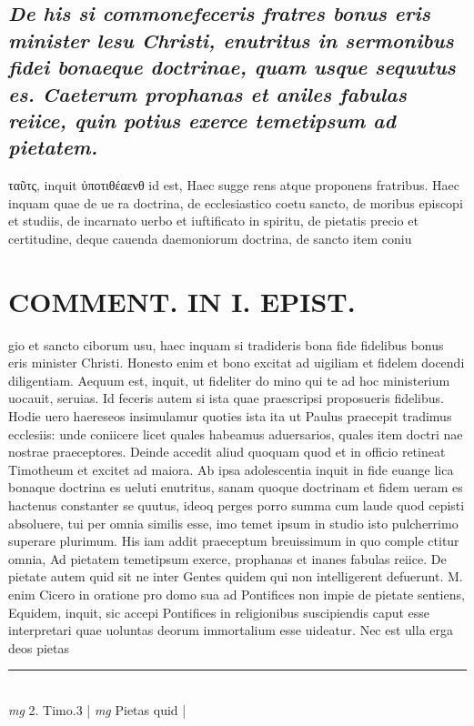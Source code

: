 \documentclass{article}
\begin{document}
\begin{pages}
\subsection*{\textit{De his si commonefeceris fratres bonus eris minister lesu Christi, enutritus in sermonibus fidei bonaeque doctrinae, quam usque sequutus es. Caeterum prophanas et aniles fabulas reiice, quin potius exerce temetipsum ad pietatem. }}\pstart ταῦτς, inquit ὐποτιθέαενθ id est, Haec sugge rens atque proponens fratribus. Haec inquam quae de ue ra doctrina, de ecclesiastico coetu sancto, de moribus episcopi et studiis, de incarnato uerbo et iuftificato in spiritu, de pietatis precio et certitudine, deque cauenda daemoniorum doctrina, de sancto item coniu\pend
\section*{COMMENT. IN I. EPIST. }\pstart gio et sancto ciborum usu, haec inquam si tradideris bona fide fidelibus bonus eris minister Christi. Honesto enim et bono excitat ad uigiliam et fidelem docendi diligentiam. Aequum est, inquit, ut fideliter do mino qui te ad hoc ministerium uocauit, seruias. Id feceris autem si ista quae praescripsi proposueris fidelibus. Hodie uero haereseos insimulamur quoties ista ita ut Paulus praecepit tradimus ecclesiis: unde coniicere licet quales habeamus aduersarios, quales item doctri nae nostrae praeceptores. Deinde accedit aliud quoquam quod et in officio retineat Timotheum et excitet ad maiora. Ab ipsa adolescentia inquit in fide euange lica bonaque doctrina es ueluti enutritus, sanam quoque  doctrinam et fidem ueram es hactenus constanter se quutus, ideoq perges porro summa cum laude quod cepisti absoluere, tui per omnia similis esse, imo temet ipsum in studio isto pulcherrimo superare plurimum. His iam addit praeceptum breuissimum in quo comple ctitur omnia, Ad pietatem temetipsum exerce, prophanas et inanes fabulas reiice. De pietate autem quid sit ne inter Gentes quidem qui non intelligerent defuerunt. M. enim Cicero in oratione pro domo sua ad Pontifices non impie de pietate sentiens, Equidem, inquit, sic accepi Pontifices in religionibus suscipiendis caput esse interpretari quae uoluntas deorum immortalium esse uideatur. Nec est ulla erga deos pietas  \pend
\vspace{0.5cm}\noindent
\vspace{0.2cm}\rule{1cm}{0.2pt}\\ 
\hspace{0.2cm}\textit{mg}
\footnotesize 2. Timo.3 
\normalsize| 
\hspace{0.2cm}\textit{mg}
\footnotesize Pietas quid 
\normalsize| 

\end{pages}
\end{document}
